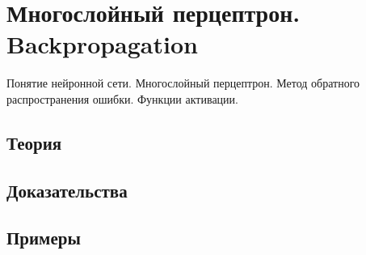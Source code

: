 
\section{Многослойный перцептрон. Backpropagation}
\label{sec:1.4.10-mlp-backprop}

\begin{ticket}
Понятие нейронной сети. Многослойный перцептрон. Метод обратного распространения ошибки. Функции активации.
\end{ticket}

\subsection*{Теория}

\subsection*{Доказательства}

\subsection*{Примеры}
